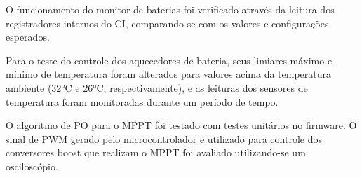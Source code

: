 O funcionamento do monitor de baterias foi verificado através da leitura dos registradores internos do CI, comparando-se com os valores e configurações esperados.

Para o teste do controle dos aquecedores de bateria, seus limiares máximo e mínimo de temperatura foram alterados para valores acima da temperatura ambiente (32°C e 26°C, respectivamente), e as leituras dos sensores de temperatura foram monitoradas durante um período de tempo.

O algoritmo de \gls{PO} para o \gls{MPPT} foi testado com testes unitários no firmware.
O sinal de \gls{PWM} gerado pelo microcontrolador e utilizado para controle dos conversores boost que realizam o \gls{MPPT} foi avaliado utilizando-se um osciloscópio.